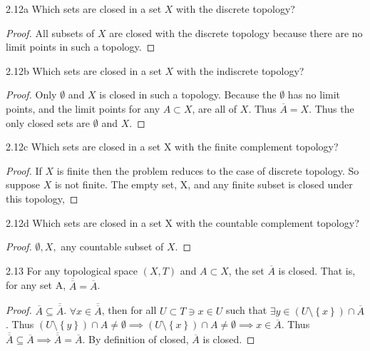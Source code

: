 \documentclass{article}
\begin{document}
\begin{PROB}{2.12a}\label{Problem 2.12a.}
    Which sets are closed in a set $X$ with the discrete topology? 
\end{PROB}
\begin{proof}
    All subsets of $X$ are closed with the discrete topology because there are no limit points in such a topology. 
\end{proof}
\begin{PROB}{2.12b}\label{Problem 2.12b.}
    Which sets are closed in a set $X$ with the indiscrete topology?
\end{PROB}
\begin{proof}
    Only $\emptyset$ and $X$ is closed in such a topology. Because the $\emptyset$ has no limit points, and the limit points for any $A \subset X$, are all of $X$. Thus $\overline{A} = X$. Thus the only closed sets are $\emptyset$ and $X$.        
\end{proof}
\begin{PROB}{2.12c}\label{Problem 2.12c.}
    Which sets are closed in a set X with the finite complement topology?
\end{PROB}
\begin{proof}
    If $X$ is finite then the problem reduces to the case of discrete topology. So suppose $X$ is not finite. The empty set, X, and any finite subset is closed under this topology,   
\end{proof}
\begin{PROB}{2.12d}\label{Problem 2.12d.}
    Which sets are closed in a set X with the countable complement topology?
\end{PROB}
\begin{proof}
    $\emptyset, X, $ any countable subset of $X$.   
\end{proof}

\bigskip

\begin{claim}{2.13}\label{Claim 2.13.}
    For any topological space $(X, T)$ and $A \subset X$, the set $\overline{A}$ is closed. That is, for any set A, $\overline{\overline{A}} = \overline{A}$.    
\end{claim}
\begin{proof}
    $\overline{A} \subseteq \overline{\overline{A}}$. $\forall x \in \overline{\overline{A}}$, then for all $U \subset T \ni x \in U$ such that $\exists y \in (U \setminus \left\{ x \right\}) \cap \overline{A}$. Thus $(U \setminus \left\{ y \right\}) \cap A \neq \emptyset \implies \left(U \setminus \left\{ x \right\}\right) \cap A \neq \emptyset \implies x \in \overline{A}$. Thus $\overline{\overline{A}} \subseteq \overline{A} \implies \overline{\overline{A}} = \overline{A}$. By definition of closed, $\overline{A}$ is closed.     
\end{proof}
\end{document}
